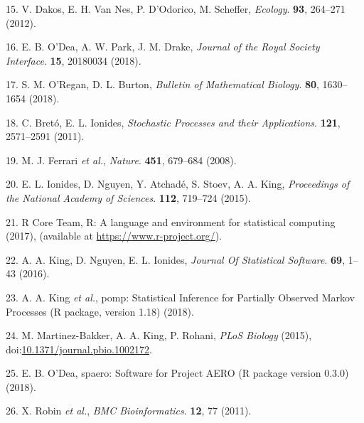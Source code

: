 \documentclass[3p]{elsarticle} %
\begin{document}
\hypertarget{ref-Dakos2012a}{}
15. V. Dakos, E. H. Van Nes, P. D'Odorico, M. Scheffer, \emph{Ecology}.
\textbf{93}, 264--271 (2012).

\hypertarget{ref-ODea2018a}{}
16. E. B. O'Dea, A. W. Park, J. M. Drake, \emph{Journal of the Royal
Society Interface}. \textbf{15}, 20180034 (2018).

\hypertarget{ref-ORegan2018}{}
17. S. M. O'Regan, D. L. Burton, \emph{Bulletin of Mathematical
Biology}. \textbf{80}, 1630--1654 (2018).

\hypertarget{ref-Breto2011}{}
18. C. Bretó, E. L. Ionides, \emph{Stochastic Processes and their
Applications}. \textbf{121}, 2571--2591 (2011).

\hypertarget{ref-Ferrari2008}{}
19. M. J. Ferrari \emph{et al.}, \emph{Nature}. \textbf{451}, 679--684
(2008).

\hypertarget{ref-Ionides2015}{}
20. E. L. Ionides, D. Nguyen, Y. Atchadé, S. Stoev, A. A. King,
\emph{Proceedings of the National Academy of Sciences}. \textbf{112},
719--724 (2015).

\hypertarget{ref-R2017}{}
21. R Core Team, R: A language and environment for statistical computing
(2017), (available at \url{https://www.r-project.org/}).

\hypertarget{ref-King2016}{}
22. A. A. King, D. Nguyen, E. L. Ionides, \emph{Journal Of Statistical
Software}. \textbf{69}, 1--43 (2016).

\hypertarget{ref-King2018}{}
23. A. A. King \emph{et al.}, pomp: Statistical Inference for Partially
Observed Markov Processes (R package, version 1.18) (2018).

\hypertarget{ref-Martinez-Bakker2015}{}
24. M. Martinez-Bakker, A. A. King, P. Rohani, \emph{PLoS Biology}
(2015),
doi:\href{https://doi.org/10.1371/journal.pbio.1002172}{10.1371/journal.pbio.1002172}.

\hypertarget{ref-ODea2018}{}
25. E. B. O'Dea, spaero: Software for Project AERO (R package version
0.3.0) (2018).

\hypertarget{ref-Robin2011}{}
26. X. Robin \emph{et al.}, \emph{BMC Bioinformatics}. \textbf{12}, 77
(2011).
\end{document}
